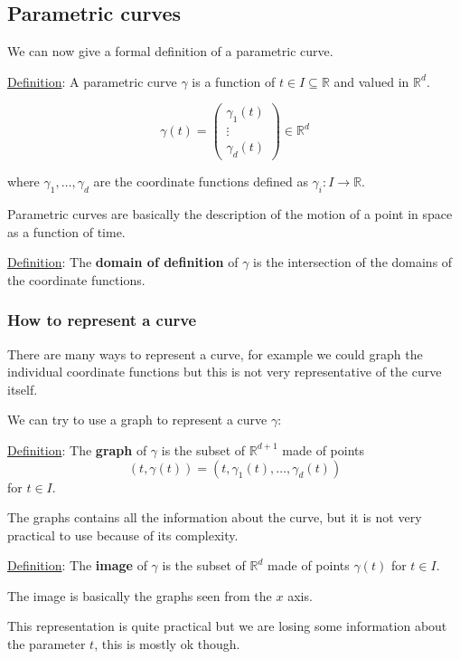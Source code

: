 \documentclass[10pt]{extarticle}
\newcommand{\R}{\mathbb{R}}
\begin{document}

\subsection{Parametric curves}

We can now give a formal definition of a parametric curve.

\underline{Definition}: A parametric curve $\gamma$ is a function of $t \in I \subseteq \R$ and valued in $\R^d$.

$$
    \gamma(t) = \begin{pmatrix}
        \gamma_1(t) \\
        \vdots      \\
        \gamma_d(t)
    \end{pmatrix} \in \R^d
$$

where $\gamma_1, \ldots, \gamma_d$ are the coordinate functions defined as $\gamma_i: I \to \R$.

Parametric curves are basically the description of the motion of a point in space as a function of time.

\underline{Definition}: The \textbf{domain of definition} of $\gamma$ is the intersection of the domains of the coordinate functions.

\subsubsection{How to represent a curve}

There are many ways to represent a curve, for example we could graph the individual coordinate functions but this is not very representative of the curve itself.

We can try to use a graph to represent a curve $\gamma$:

\underline{Definition}: The \textbf{graph} of $\gamma$ is the subset of $\R^{d+1}$ made of points
$$
    (t, \gamma(t)) = (t, \gamma_1(t), \ldots, \gamma_d(t))
$$
for $t \in I$.

The graphs contains all the information about the curve, but it is not very practical to use because of its complexity.

\underline{Definition}: The \textbf{image} of $\gamma$ is the subset of $\R^d$ made of points $\gamma(t)$ for $t \in I$.

The image is basically the graphs seen from the $x$ axis.

This representation is quite practical but we are losing some information about the parameter $t$, this is mostly ok though.
\end{document}
